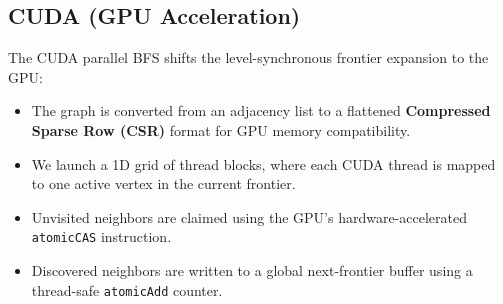 \documentclass[12pt, a4paper]{article}
\begin{document}
\subsection{CUDA (GPU Acceleration)}
The CUDA parallel BFS shifts the level-synchronous frontier expansion to the GPU:
\begin{itemize}[leftmargin=*]
    \item The graph is converted from an adjacency list to a flattened \textbf{Compressed Sparse Row (CSR)} format for GPU memory compatibility.
    \item We launch a 1D grid of thread blocks, where each CUDA thread is mapped to one active vertex in the current frontier.
    \item Unvisited neighbors are claimed using the GPU's hardware-accelerated \texttt{atomicCAS} instruction.
    \item Discovered neighbors are written to a global next-frontier buffer using a thread-safe \texttt{atomicAdd} counter.
\end{itemize}
\end{document}
